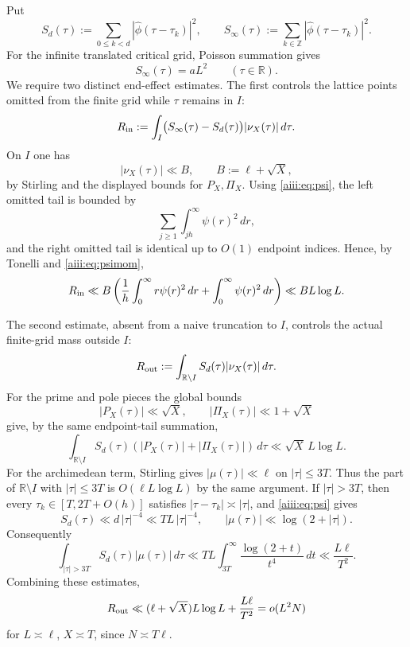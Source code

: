 \documentclass[11pt]{article}
\begin{document}
Put
\[
 S_d(\tau):=\sum_{0\le k<d}|\widehat\phi(\tau-\tau_k)|^2,
 \qquad
 S_\infty(\tau):=\sum_{k\in\mathbb Z}
 |\widehat\phi(\tau-\tau_k)|^2.
\]
For the infinite translated critical grid, Poisson summation gives
\begin{equation}\label{aiii:eq:poisson-trace}
 S_\infty(\tau)=aL^2
 \qquad(\tau\in\mathbb R).
\end{equation}
We require two distinct end-effect estimates.  The first controls the lattice
points omitted from the finite grid while $\tau$ remains in $I$:
\[
 R_{\rm in}:=\int_I\bigl(S_\infty(\tau)-S_d(\tau)\bigr)
 |\nu_X(\tau)|\,d\tau.
\]
On $I$ one has
\[
 |\nu_X(\tau)|\ll B,\qquad B:=\ell+\sqrt X,
\]
by Stirling and the displayed bounds for $P_X,\Pi_X$.  Using
\eqref{aiii:eq:psi}, the left omitted tail is bounded by
\[
 \sum_{j\ge1}\int_{jh}^{\infty}\psi(r)^2\,dr,
\]
and the right omitted tail is identical up to $O(1)$ endpoint indices.
Hence, by Tonelli and \eqref{aiii:eq:psimom},
\begin{equation}\label{aiii:eq:Rin}
 R_{\rm in}\ll
 B\left(
 \frac1h\int_0^\infty r\psi(r)^2\,dr
 +\int_0^\infty\psi(r)^2\,dr
 \right)
 \ll BL\log L.
\end{equation}

The second estimate, absent from a naive truncation to $I$, controls the
actual finite-grid mass outside $I$:
\[
 R_{\rm out}:=\int_{\mathbb R\setminus I}
 S_d(\tau)|\nu_X(\tau)|\,d\tau.
\]
For the prime and pole pieces the global bounds
\[
 |P_X(\tau)|\ll\sqrt X,\qquad |\Pi_X(\tau)|\ll 1+\sqrt X
\]
give, by the same endpoint-tail summation,
\begin{equation}\label{aiii:eq:Rout-pp}
 \int_{\mathbb R\setminus I}S_d(\tau)
 (|P_X(\tau)|+|\Pi_X(\tau)|)\,d\tau
 \ll \sqrt X\,L\log L.
\end{equation}
For the archimedean term, Stirling gives
$|\mu(\tau)|\ll\ell$ on $|\tau|\le3T$.  Thus the part of
$\mathbb R\setminus I$ with $|\tau|\le3T$ is $O(\ell L\log L)$ by the same
argument.  If $|\tau|>3T$, then every $\tau_k\in[T,2T+O(h)]$ satisfies
$|\tau-\tau_k|\asymp|\tau|$, and \eqref{aiii:eq:psi} gives
\[
 S_d(\tau)\ll d\,|\tau|^{-4}\ll TL\,|\tau|^{-4},
 \qquad
 |\mu(\tau)|\ll\log(2+|\tau|).
\]
Consequently
\[
 \int_{|\tau|>3T}S_d(\tau)|\mu(\tau)|\,d\tau
 \ll TL\int_{3T}^\infty\frac{\log(2+t)}{t^4}\,dt
 \ll \frac{L\ell}{T^2}.
\]
Combining these estimates,
\begin{equation}\label{aiii:eq:Rout}
 R_{\rm out}\ll(\ell+\sqrt X)L\log L+\frac{L\ell}{T^2}
 =o(L^2N)
\end{equation}
for $L\asymp\ell$, $X\asymp T$, since $N\asymp T\ell$.
\end{document}
